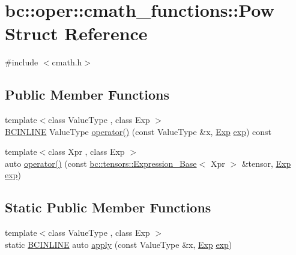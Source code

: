 \hypertarget{structbc_1_1oper_1_1cmath__functions_1_1Pow}{}\section{bc\+:\+:oper\+:\+:cmath\+\_\+functions\+:\+:Pow Struct Reference}
\label{structbc_1_1oper_1_1cmath__functions_1_1Pow}


{\ttfamily \#include $<$cmath.\+h$>$}

\subsection*{Public Member Functions}
\begin{DoxyCompactItemize}
\item 
{\footnotesize template$<$class Value\+Type , class Exp $>$ }\\\hyperlink{common_8h_a6699e8b0449da5c0fafb878e59c1d4b1}{B\+C\+I\+N\+L\+I\+NE} Value\+Type \hyperlink{structbc_1_1oper_1_1cmath__functions_1_1Pow_ad44828a1e300cc2adf15397703c17150}{operator()} (const Value\+Type \&x, \hyperlink{structbc_1_1oper_1_1cmath__functions_1_1Exp}{Exp} \hyperlink{namespacebc_1_1oper_1_1cmath__functions_a2843a3ce6edfc8c4395cf2754348aaf9}{exp}) const
\item 
{\footnotesize template$<$class Xpr , class Exp $>$ }\\auto \hyperlink{structbc_1_1oper_1_1cmath__functions_1_1Pow_a88e73d16af79a5d487f7e00d7b3f5719}{operator()} (const \hyperlink{classbc_1_1tensors_1_1Expression__Base}{bc\+::tensors\+::\+Expression\+\_\+\+Base}$<$ Xpr $>$ \&tensor, \hyperlink{structbc_1_1oper_1_1cmath__functions_1_1Exp}{Exp} \hyperlink{namespacebc_1_1oper_1_1cmath__functions_a2843a3ce6edfc8c4395cf2754348aaf9}{exp})
\end{DoxyCompactItemize}
\subsection*{Static Public Member Functions}
\begin{DoxyCompactItemize}
\item 
{\footnotesize template$<$class Value\+Type , class Exp $>$ }\\static \hyperlink{common_8h_a6699e8b0449da5c0fafb878e59c1d4b1}{B\+C\+I\+N\+L\+I\+NE} auto \hyperlink{structbc_1_1oper_1_1cmath__functions_1_1Pow_af3407a042ba2f19d285eac300d38fad7}{apply} (const Value\+Type \&x, \hyperlink{structbc_1_1oper_1_1cmath__functions_1_1Exp}{Exp} \hyperlink{namespacebc_1_1oper_1_1cmath__functions_a2843a3ce6edfc8c4395cf2754348aaf9}{exp})
\end{DoxyCompactItemize}


